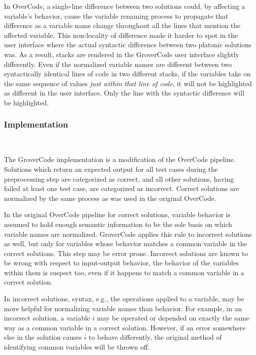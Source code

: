In OverCode, a single-line difference between two solutions could, by affecting a variable's behavior, cause the variable renaming process to propagate that difference as a variable name change throughout all the lines that mention the affected variable. This non-locality of difference made it harder to spot in the user interface where the actual syntactic difference between two platonic solutions was. As a result, stacks are rendered in the GroverCode user interface slightly differently. Even if the normalized variable names are different between two syntactically identical lines of code in two different stacks, if the variables take on the same sequence of values {\it just within that line of code}, it will not be highlighted as different in the user interface. Only the line with the syntactic difference will be highlighted.


\subsubsection{Implementation}~\label{subsec:grovercodepipeline}

The GroverCode implementation is a modification of the OverCode pipeline. Solutions which return an expected output for all test cases during the preprocessing step are categorized as correct, and all other solutions, having failed at least one test case, are categorized as incorrect. Correct solutions are normalized by the same process as was used in the original OverCode. 

In the original OverCode pipeline for correct solutions, variable behavior is assumed to hold enough semantic information to be the sole basis on which variable names are normalized. GroverCode applies this rule to incorrect solutions as well, but only for variables whose behavior matches a common variable in the correct solutions. This step may be error prone. Incorrect solutions are known to be wrong with respect to input-output behavior, the behavior of the variables within them is suspect too, even if it happens to match a common variable in a correct solution. %


In incorrect solutions, syntax, e.g., the operations applied to a variable, may be more helpful for normalizing variable names than behavior. For example, in an incorrect solution, a variable $i$ may be operated or depended on exactly the same way as a common variable in a correct solution. However, if an error somewhere else in the solution causes $i$ to behave differently, the original method of identifying common variables will be thrown off. %

